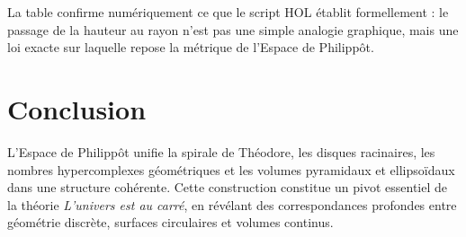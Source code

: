 \documentclass[12pt]{article}
\begin{document}
La table confirme numériquement ce que le script HOL établit formellement :
le passage de la hauteur au rayon n’est pas une simple analogie graphique,
mais une loi exacte sur laquelle repose la métrique de l’Espace de Philippôt.

\section*{Conclusion}

L’Espace de Philippôt unifie la spirale de Théodore, les disques racinaires, les nombres hypercomplexes géométriques et les volumes pyramidaux et ellipsoïdaux dans une structure cohérente. Cette construction constitue un pivot essentiel de la théorie \emph{L’univers est au carré}, en révélant des correspondances profondes entre géométrie discrète, surfaces circulaires et volumes continus.
\end{document}
